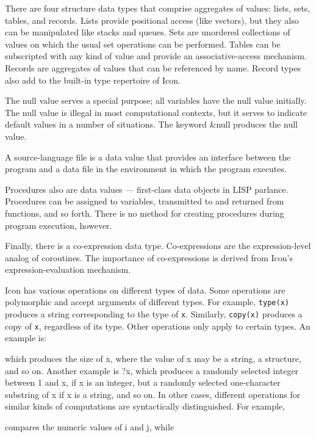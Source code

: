 There are four structure data types that comprise aggregates of
values: lists, sets, tables, and records. Lists provide positional
access (like vectors), but they also can be manipulated like stacks
and queues. Sets are unordered collections of values on which the
usual set operations can be performed. Tables can be subscripted with
any kind of value and provide an associative-access mechanism. Records
are aggregates of values that can be referenced by name.  Record types
also add to the built-in type repertoire of Icon.

The null value serves a special purpose; all variables have the null value initially. The null value is illegal in most
computational contexts, but it serves to indicate default values in a number of situations. The keyword \&null produces
the null value.

A source-language file is a data value that provides an interface
between the program and a data file in the environment in which the
program executes.

Procedures also are data values --- {\textquotedbl}first-class data
objects{\textquotedbl} in LISP parlance.  Procedures can be assigned
to variables, transmitted to and returned from functions, and so
forth. There is no method for creating procedures during program
execution, however.

Finally, there is a co-expression data type. Co-expressions are the
expression-level analog of coroutines. The importance of
co-expressions is derived from Icon's expression-evaluation mechanism.

Icon has various operations on different types of data. Some
operations are polymorphic and accept arguments of different
types. For example, \texttt{type(x)} produces a string corresponding
to the type of \texttt{x}. Similarly, \texttt{copy(x)} produces a copy
of \texttt{x}, regardless of its type. Other operations only apply to
certain types. An example is:



\noindent which produces the size of x, where the value of x may be a
string, a structure, and so on. Another example is ?x, which produces
a randomly selected integer between 1 and x, if x is an integer, but a
randomly selected one-character substring of x if x is a string, and
so on. In other cases, different operations for similar kinds of
computations are syntactically distinguished. For example,


\noindent compares the numeric values of i and j, while

